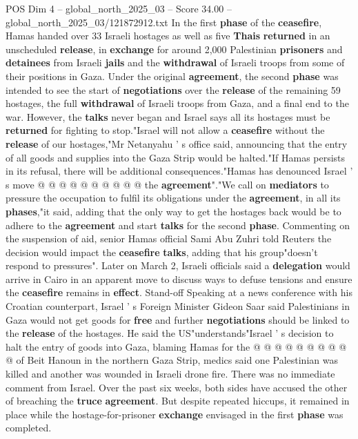 \begin{textsample}{POS Dim 4 – global\_north\_2025\_03 – Score 34.00 – global\_north\_2025\_03/121872912.txt}
In the first \textbf{phase} of the \textbf{ceasefire}, Hamas handed over 33 Israeli hostages as well as five \textbf{Thais} \textbf{returned} in an unscheduled \textbf{release}, in \textbf{exchange} for around 2,000 Palestinian \textbf{prisoners} and \textbf{detainees} from Israeli \textbf{jails} and the \textbf{withdrawal} of Israeli troops from some of their positions in Gaza.
Under the original \textbf{agreement}, the second \textbf{phase} was intended to see the start of \textbf{negotiations} over the \textbf{release} of the remaining 59 hostages, the full \textbf{withdrawal} of Israeli troops from Gaza, and a final end to the war.
However, the \textbf{talks} never began and Israel says all its hostages must be \textbf{returned} for fighting to stop."Israel will not allow a \textbf{ceasefire} without the \textbf{release} of our hostages,"Mr Netanyahu ' s office said, announcing that the entry of all goods and supplies into the Gaza Strip would be halted."If Hamas persists in its refusal, there will be additional consequences."Hamas has denounced Israel ' s move @ @ @ @ @ @ @ @ @ @ the \textbf{agreement}"."We call on \textbf{mediators} to pressure the occupation to fulfil its obligations under the \textbf{agreement}, in all its \textbf{phases},"it said, adding that the only way to get the hostages back would be to adhere to the \textbf{agreement} and start \textbf{talks} for the second \textbf{phase}.
Commenting on the suspension of aid, senior Hamas official Sami Abu Zuhri told Reuters the decision would impact the \textbf{ceasefire} \textbf{talks}, adding that his group"doesn't respond to pressures".
Later on March 2, Israeli officials said a \textbf{delegation} would arrive in Cairo in an apparent move to discuss ways to defuse tensions and ensure the \textbf{ceasefire} remains in \textbf{effect}.
Stand-off Speaking at a news conference with his Croatian counterpart, Israel ' s Foreign Minister Gideon Saar said Palestinians in Gaza would not get goods for \textbf{free} and further \textbf{negotiations} should be linked to the \textbf{release} of the hostages.
He said the US"understands"Israel ' s decision to halt the entry of goods into Gaza, blaming Hamas for the @ @ @ @ @ @ @ @ @ @ of Beit Hanoun in the northern Gaza Strip, medics said one Palestinian was killed and another was wounded in Israeli drone fire.
There was no immediate comment from Israel.
Over the past six weeks, both sides have accused the other of breaching the \textbf{truce} \textbf{agreement}.
But despite repeated hiccups, it remained in place while the hostage-for-prisoner \textbf{exchange} envisaged in the first \textbf{phase} was completed.

\end{textsample}
